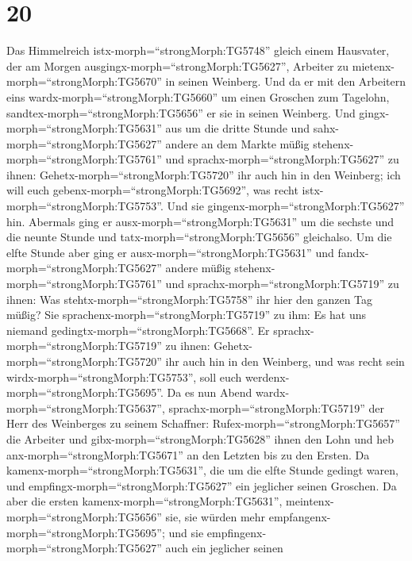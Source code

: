 \hypertarget{section-19}{%
\section{20}\label{section-19}}

 Das Himmelreich istx-morph=``strongMorph:TG5748'' gleich
einem Hausvater, der am Morgen ausgingx-morph=``strongMorph:TG5627'',
Arbeiter zu mietenx-morph=``strongMorph:TG5670'' in seinen Weinberg.
 Und da er mit den Arbeitern eins
wardx-morph=``strongMorph:TG5660'' um einen Groschen zum Tagelohn,
sandtex-morph=``strongMorph:TG5656'' er sie in seinen Weinberg.
 Und gingx-morph=``strongMorph:TG5631'' aus um die dritte
Stunde und sahx-morph=``strongMorph:TG5627'' andere an dem Markte müßig
stehenx-morph=``strongMorph:TG5761''  und
sprachx-morph=``strongMorph:TG5627'' zu ihnen:
Gehetx-morph=``strongMorph:TG5720'' ihr auch hin in den Weinberg; ich
will euch gebenx-morph=``strongMorph:TG5692'', was recht
istx-morph=``strongMorph:TG5753''.  Und sie
gingenx-morph=``strongMorph:TG5627'' hin. Abermals ging er
ausx-morph=``strongMorph:TG5631'' um die sechste und die neunte Stunde
und tatx-morph=``strongMorph:TG5656'' gleichalso.  Um die
elfte Stunde aber ging er ausx-morph=``strongMorph:TG5631'' und
fandx-morph=``strongMorph:TG5627'' andere müßig
stehenx-morph=``strongMorph:TG5761'' und
sprachx-morph=``strongMorph:TG5719'' zu ihnen: Was
stehtx-morph=``strongMorph:TG5758'' ihr hier den ganzen Tag müßig?
 Sie sprachenx-morph=``strongMorph:TG5719'' zu ihm: Es hat
uns niemand gedingtx-morph=``strongMorph:TG5668''. Er
sprachx-morph=``strongMorph:TG5719'' zu ihnen:
Gehetx-morph=``strongMorph:TG5720'' ihr auch hin in den Weinberg, und
was recht sein wirdx-morph=``strongMorph:TG5753'', soll euch
werdenx-morph=``strongMorph:TG5695''.  Da es nun Abend
wardx-morph=``strongMorph:TG5637'', sprachx-morph=``strongMorph:TG5719''
der Herr des Weinberges zu seinem Schaffner:
Rufex-morph=``strongMorph:TG5657'' die Arbeiter und
gibx-morph=``strongMorph:TG5628'' ihnen den Lohn und heb
anx-morph=``strongMorph:TG5671'' an den Letzten bis zu den Ersten.
 Da kamenx-morph=``strongMorph:TG5631'', die um die elfte
Stunde gedingt waren, und empfingx-morph=``strongMorph:TG5627'' ein
jeglicher seinen Groschen.  Da aber die ersten
kamenx-morph=``strongMorph:TG5631'',
meintenx-morph=``strongMorph:TG5656'' sie, sie würden mehr
empfangenx-morph=``strongMorph:TG5695''; und sie
empfingenx-morph=``strongMorph:TG5627'' auch ein jeglicher seinen
